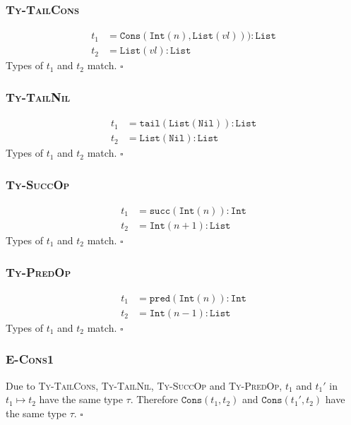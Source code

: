 \documentclass[13pt, a4paper]{article}
\begin{document}
\subsubsection*{\textmd{\textsc{Ty-TailCons}}}
\begin{align}
t_1 &= \texttt{Cons}(\texttt{Int}(n), \texttt{List}(vl))) : \texttt{List} \\
t_2 &= \texttt{List}(vl) : \texttt{List}
\end{align}
Types of $t_1$ and $t_2$ match. $\square$

\subsubsection*{\textmd{\textsc{Ty-TailNil}}}
\begin{align}
t_1 &= \texttt{tail}(\texttt{List}(\texttt{Nil})) : \texttt{List} \\
t_2 &= \texttt{List}(\texttt{Nil}) : \texttt{List}
\end{align}
Types of $t_1$ and $t_2$ match. $\square$

\subsubsection*{\textmd{\textsc{Ty-SuccOp}}}
\begin{align}
t_1 &= \texttt{succ}(\texttt{Int}(n)) : \texttt{Int} \\
t_2 &= \texttt{Int}(n + 1) : \texttt{List}
\end{align}
Types of $t_1$ and $t_2$ match. $\square$

\subsubsection*{\textmd{\textsc{Ty-PredOp}}}
\begin{align}
t_1 &= \texttt{pred}(\texttt{Int}(n)) : \texttt{Int} \\
t_2 &= \texttt{Int}(n - 1) : \texttt{List}
\end{align}
Types of $t_1$ and $t_2$ match. $\square$

\subsubsection*{\textmd{\textsc{E-Cons1}}}
Due to \textsc{Ty-TailCons}, \textsc{Ty-TailNil}, \textsc{Ty-SuccOp} and \textsc{Ty-PredOp}, $t_1$ and $t_1'$ in $t_1 \mapsto t_2$ have the same type $\tau$. Therefore $\texttt{Cons}(t_1, t_2)$ and $\texttt{Cons}(t_1', t_2)$ have the same type $\tau$. $\square$
\end{document}
